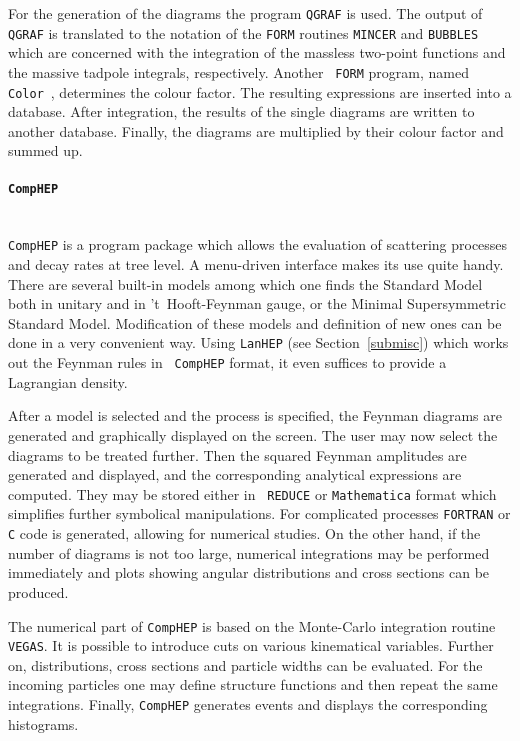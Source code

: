 For the generation of the diagrams the program {\tt QGRAF} is used. The
output of {\tt QGRAF} is translated to the notation of
the {\tt FORM} routines {\tt MINCER} and {\tt BUBBLES}~\cite{bubbles}
which are concerned with the integration of the massless two-point
functions and the massive tadpole integrals, respectively.  Another {\tt
  FORM} program, named {\tt Color}~\cite{color}, determines the colour
factor. The resulting expressions are inserted into a database.  After
integration, the results of the single diagrams are written to another
database.  Finally, the diagrams are multiplied by their colour factor
and summed up.


\paragraph{{\tt CompHEP}}\mbox{}\\[1em]
%
{\tt CompHEP} \cite{comphep} is a program package which allows the
evaluation of scattering processes and decay rates at tree level.  A
menu-driven interface makes its use quite handy.  There are several
built-in models among which one finds the Standard Model both in
unitary and in 't~Hooft-Feynman gauge, or the Minimal Supersymmetric
Standard Model. Modification of these models and definition of new ones
can be done in a very convenient way. Using {\tt LanHEP} (see
Section~\ref{submisc}) which works out the Feynman rules in {\tt
  CompHEP} format, it even suffices to provide a Lagrangian density.

After a model is selected and the process is specified, the Feynman
diagrams are generated and graphically displayed on the screen.  The
user may now select the diagrams to be treated further. Then the squared
Feynman amplitudes are generated and displayed, and the corresponding
analytical expressions are computed.  They may be stored either in {\tt
  REDUCE} or {\tt Mathematica} format which simplifies further
symbolical manipulations.  For complicated processes {\tt FORTRAN} or
{\tt C} code is generated, allowing for numerical studies.  On the other
hand, if the number of diagrams is not too large, numerical integrations
may be performed immediately and plots showing angular distributions and
cross sections can be produced.

The numerical part of {\tt CompHEP} is based on the Monte-Carlo
integration routine {\tt VEGAS}.  It is possible to introduce
cuts on various kinematical variables.
Further on, distributions, cross sections
and particle widths can be evaluated.  For the incoming particles one
may define structure functions and then repeat the same integrations.
Finally, {\tt CompHEP} generates events and displays the corresponding
histograms.

